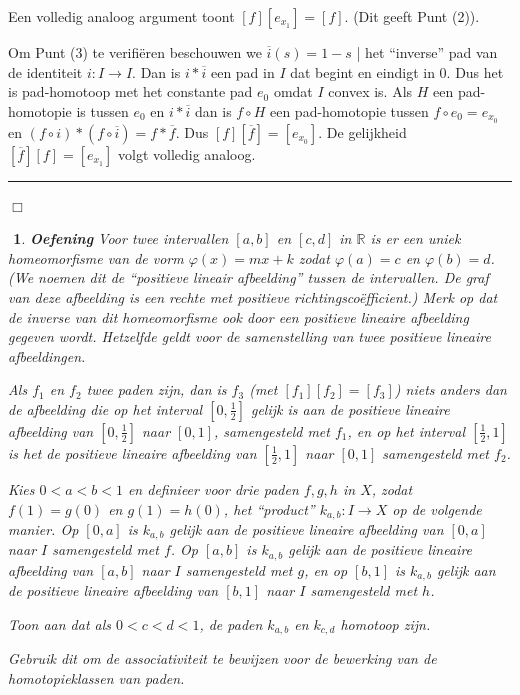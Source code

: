 \documentclass[12pt]{book}
\newcommand{\B}{\rule{1mm}{0mm} \hfill $\Box$ }
\newtheorem{eoef}{$\!\!$}[chapter]
\newenvironment{oef}{\begin{eoef} {\bf Oefening}}{\end{eoef}}
\begin{document}
Een volledig analoog argument toont $[f][e_{x_{1}}]=[f]$. (Dit geeft Punt (2)).


Om Punt (3) te verifi\"eren beschouwen we $\overline{i}(s)=1-s$ | het ``inverse'' pad van de identiteit $i:I\to I$.
Dan is  $i * \overline{i}$ een pad in $I$ dat begint en eindigt in $0$. Dus het is pad-homotoop met het constante pad $e_0$ omdat $I$ convex is. Als $H$ een pad-homotopie is tussen $e_0$ en $i * \overline{i}$ dan is $f\circ H$ een pad-homotopie tussen $f\circ e_0=e_{x_{0}}$ en $(f\circ i) * (f\circ \overline{i})=f * \overline{f}.$ Dus $[f][\overline{f}]=[e_{x_{0}}]$. De gelijkheid $[\overline{f}][f]=[e_{x_{1}}]$ volgt volledig analoog.
\B





\begin{oef} \label{oef:ass}
Voor twee intervallen  $[a,b]$ en $[c,d]$ in $\mathbb{R}$ is er een uniek homeomorfisme van de vorm 
$\varphi(x)=mx+k$ zodat $\varphi(a)=c$ en $\varphi(b)=d$. (We noemen dit de ``positieve lineair afbeelding'' tussen de intervallen. De graf van deze afbeelding is een rechte met positieve richtingsco\"efficient.) Merk op dat de inverse van dit homeomorfisme ook door een positieve lineaire afbeelding gegeven wordt. Hetzelfde geldt voor de samenstelling van twee positieve lineaire afbeeldingen.

Als $f_1$ en $f_2$ twee paden zijn, dan is $f_3$ (met $[f_1][f_2]=[f_3]$) niets anders dan de afbeelding die op het interval $[0,\frac{1}{2}]$ gelijk is aan de positieve lineaire afbeelding van $[0,\frac{1}{2}]$ naar $[0,1]$, samengesteld met $f_1$, en op het interval $[\frac{1}{2}, 1]$ is het de positieve lineaire afbeelding van $[\frac{1}{2}, 1]$ naar $[0,1]$ samengesteld met $f_2$.

Kies $0<a<b<1$ en definieer voor drie paden $f,g,h$ in $X$, zodat $f(1)=g(0)$ en $g(1)=h(0)$, het ``product''
$k_{a,b}:I\to X$ op de volgende manier. Op $[0,a]$ is $k_{a,b}$ gelijk aan de positieve lineaire afbeelding van $[0,a]$ naar $I$ samengesteld met $f$. Op $[a,b]$ is $k_{a,b}$ gelijk aan de positieve lineaire afbeelding van $[a,b]$ naar $I$ samengesteld met $g$, en op $[b,1]$ is $k_{a,b}$ gelijk aan de positieve lineaire afbeelding van $[b,1]$ naar $I$ samengesteld met $h$. 

Toon aan dat als $0<c<d<1$, de paden $k_{a,b}$ en $k_{c,d}$ homotoop zijn. 

Gebruik dit om de associativiteit te bewijzen voor de bewerking van de homotopieklassen van paden.
\end{oef}
\end{document}
